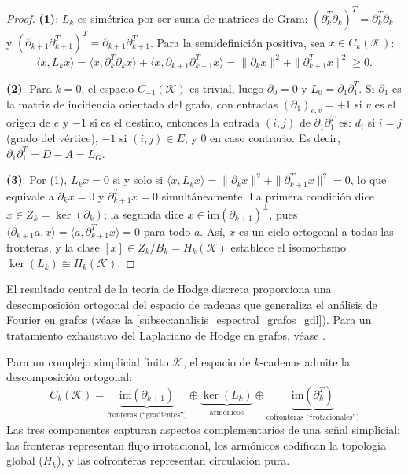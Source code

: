 \begin{proof}
	\textbf{(1)}: $L_k$ es simétrica por ser suma de matrices de Gram: $(\partial_k^T \partial_k)^T = \partial_k^T \partial_k$ y $(\partial_{k+1} \partial_{k+1}^T)^T = \partial_{k+1} \partial_{k+1}^T$. Para la semidefinición positiva, sea $x \in C_k(\mathcal{K})$:
	\[
		\langle x, L_k x \rangle = \langle x, \partial_k^T \partial_k x \rangle + \langle x, \partial_{k+1} \partial_{k+1}^T x \rangle = \|\partial_k x\|^2 + \|\partial_{k+1}^T x\|^2 \geq 0.
	\]

	\textbf{(2)}: Para $k = 0$, el espacio $C_{-1}(\mathcal{K})$ es trivial, luego $\partial_0 = 0$ y $L_0 = \partial_1 \partial_1^T$. Si $\partial_1$ es la matriz de incidencia orientada del grafo, con entradas $(\partial_1)_{e,v} = +1$ si $v$ es el origen de $e$ y $-1$ si es el destino, entonces la entrada $(i,j)$ de $\partial_1 \partial_1^T$ es: $d_i$ si $i = j$ (grado del vértice), $-1$ si $(i,j) \in E$, y $0$ en caso contrario. Es decir, $\partial_1 \partial_1^T = D - A = L_G$.

	\textbf{(3)}: Por (1), $L_k x = 0$ si y solo si $\langle x, L_k x \rangle = \|\partial_k x\|^2 + \|\partial_{k+1}^T x\|^2 = 0$, lo que equivale a $\partial_k x = 0$ y $\partial_{k+1}^T x = 0$ simultáneamente. La primera condición dice $x \in Z_k = \ker(\partial_k)$; la segunda dice $x \in \mathrm{im}(\partial_{k+1})^\perp$, pues $\langle \partial_{k+1} a, x \rangle = \langle a, \partial_{k+1}^T x \rangle = 0$ para todo $a$. Así, $x$ es un ciclo ortogonal a todas las fronteras, y la clase $[x] \in Z_k / B_k = H_k(\mathcal{K})$ establece el isomorfismo $\ker(L_k) \cong H_k(\mathcal{K})$.
\end{proof}

El resultado central de la teoría de Hodge discreta proporciona una descomposición ortogonal del espacio de cadenas que generaliza el análisis de Fourier en grafos (véase la \autoref{subsec:analisis_espectral_grafos_gdl}). Para un tratamiento exhaustivo del Laplaciano de Hodge en grafos, véase \citet{lim2020hodge}.

\begin{theorem}\label{thm:hodge_decomposition_gdl}
	Para un complejo simplicial finito $\mathcal{K}$, el espacio de $k$-cadenas admite la descomposición ortogonal:
	\[
		C_k(\mathcal{K}) = \underbrace{\mathrm{im}(\partial_{k+1})}_{\text{fronteras (``gradientes'')}} \oplus \underbrace{\ker(L_k)}_{\text{armónicos}} \oplus \underbrace{\mathrm{im}(\partial_k^T)}_{\text{cofronteras (``rotacionales'')}}
	\]
	Las tres componentes capturan aspectos complementarios de una señal simplicial: las fronteras representan flujo irrotacional, los armónicos codifican la topología global ($H_k$), y las cofronteras representan circulación pura.
\end{theorem}


